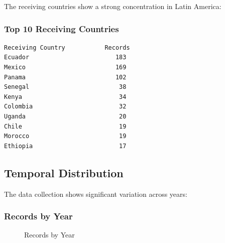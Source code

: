 \documentclass[
  11pt,
]{article}
\begin{document}
The receiving countries show a strong concentration in Latin America:

\subsubsection{Top 10 Receiving
Countries}\label{top-10-receiving-countries}

\begin{verbatim}
Receiving Country           Records
Ecuador                        183
Mexico                         169  
Panama                         102
Senegal                         38
Kenya                           34
Colombia                        32
Uganda                          20
Chile                           19
Morocco                         19
Ethiopia                        17
\end{verbatim}

\subsection{Temporal Distribution}\label{temporal-distribution}

The data collection shows significant variation across years:

\subsubsection{Records by Year}\label{records-by-year}

\begin{figure}[H]


\caption{\label{fig-records-by-year}Records by Year}

\end{figure}%
\end{document}
